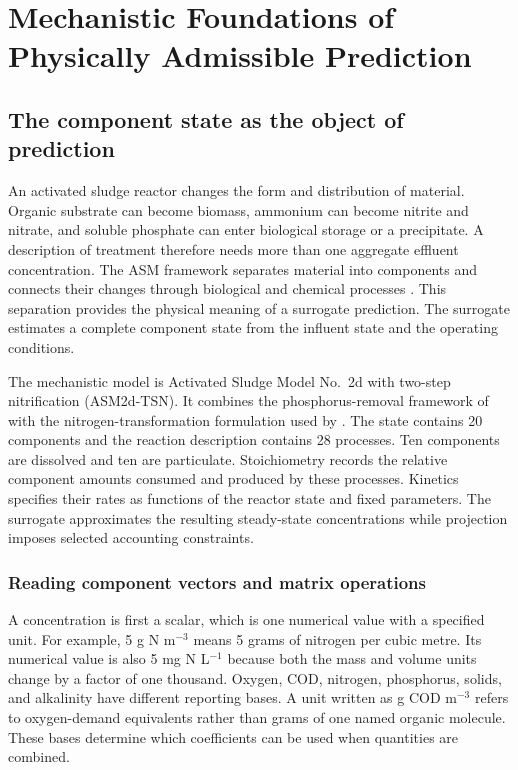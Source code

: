 \chapter{Mechanistic Foundations of Physically Admissible Prediction}
\label{ch:foundations}

\section{The component state as the object of prediction}

An activated sludge reactor changes the form and distribution of material. Organic substrate can become biomass, ammonium can become nitrite and nitrate, and soluble phosphate can enter biological storage or a precipitate. A description of treatment therefore needs more than one aggregate effluent concentration. The ASM framework separates material into components and connects their changes through biological and chemical processes \citep{Henze2006}. This separation provides the physical meaning of a surrogate prediction. The surrogate estimates a complete component state from the influent state and the operating conditions.

The mechanistic model is Activated Sludge Model No.\ 2d with two-step nitrification (ASM2d-TSN). It combines the phosphorus-removal framework of \citet{Henze2006} with the nitrogen-transformation formulation used by \citet{Guerrero2011}. The state contains 20 components and the reaction description contains 28 processes. Ten components are dissolved and ten are particulate. Stoichiometry records the relative component amounts consumed and produced by these processes. Kinetics specifies their rates as functions of the reactor state and fixed parameters. The surrogate approximates the resulting steady-state concentrations while projection imposes selected accounting constraints.

\subsection{Reading component vectors and matrix operations}

A concentration is first a scalar, which is one numerical value with a specified unit. For example, 5 g N m$^{-3}$ means 5 grams of nitrogen per cubic metre. Its numerical value is also 5 mg N L$^{-1}$ because both the mass and volume units change by a factor of one thousand. Oxygen, COD, nitrogen, phosphorus, solids, and alkalinity have different reporting bases. A unit written as g COD m$^{-3}$ refers to oxygen-demand equivalents rather than grams of one named organic molecule. These bases determine which coefficients can be used when quantities are combined.

